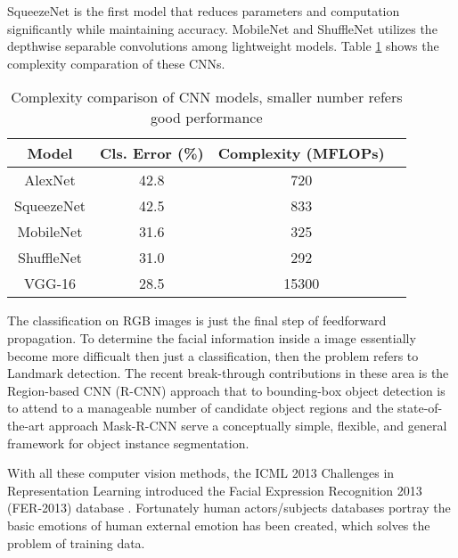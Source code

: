 SqueezeNet \cite{iandola2016squeezenet} is the first model that reduces parameters and computation significantly while maintaining accuracy. MobileNet \cite{howard2017mobilenets} and ShuffleNet \cite{zhang2017shufflenet} utilizes the depthwise separable convolutions among lightweight models. Table \ref{tab:cnn} shows the complexity comparation of these CNNs.

\begin{table}[htb]
  \caption{Complexity comparison of CNN models, smaller number refers good performance}
  \label{tab:cnn}
  \scriptsize
  \begin{center}
    \begin{tabular}{cccc}
      Model & Cls. Error (\%) &  Complexity (MFLOPs) \\
    \hline
    AlexNet\cite{Krizhevsky2012}                   & 42.8         &  720    \\
    SqueezeNet\cite{iandola2016squeezenet}                & 42.5         &  833    \\
    MobileNet\cite{howard2017mobilenets}                 & 31.6         &  325    \\
    ShuffleNet\cite{zhang2017shufflenet}                & 31.0         &  292    \\
    VGG-16\cite{Simonyan2015}                    & 28.5         & 15300
    \end{tabular}
  \end{center}
\end{table}

The classification on RGB images is just the final step of feedforward propagation. To determine the facial information inside a image essentially become more difficualt then just a classification, then the problem refers to Landmark detection.
The recent break-through contributions in these area is the Region-based CNN (R-CNN) approach \cite{girshick2014rich} that to bounding-box object detection is to attend to a manageable number of candidate object regions and the state-of-the-art approach Mask-R-CNN \cite{he2017mask} serve a conceptually simple, flexible, and general framework for object instance segmentation.

With all these computer vision methods, the ICML 2013 Challenges in Representation Learning introduced the Facial Expression Recognition 2013 (FER-2013)
database \cite{goodfellow2013challenges}. Fortunately human actors/subjects databases portray the basic emotions of human external emotion has been created, which solves the problem of training data.

